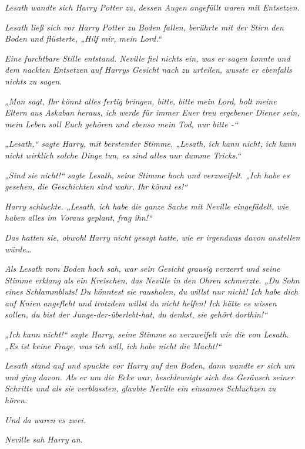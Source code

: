 {\emph{Lesath wandte sich Harry Potter zu, dessen Augen angefüllt waren mit Entsetzen.}

\emph{Lesath ließ sich vor Harry Potter zu Boden fallen, berührte mit der Stirn den Boden und flüsterte, „Hilf mir, mein Lord.“}

\emph{Eine furchtbare Stille entstand. Neville fiel nichts ein, was er sagen konnte und dem nackten Entsetzen auf Harrys Gesicht nach zu urteilen, wusste er ebenfalls nichts zu sagen.}

\emph{„Man sagt, Ihr könnt alles fertig bringen, bitte, bitte mein Lord, holt meine Eltern aus Askaban heraus, ich werde für immer Euer treu ergebener Diener sein, mein Leben soll Euch gehören und ebenso mein Tod, nur bitte -“}

\emph{„Lesath,“ sagte Harry, mit berstender Stimme, „Lesath, ich kann nicht, ich kann nicht wirklich solche Dinge tun, es sind alles nur dumme Tricks.“}

\emph{„Sind sie} \emph{\emph{nicht!}“ sagte Lesath, seine Stimme hoch und verzweifelt. „Ich habe es} \emph{\emph{gesehen,}} \emph{die Geschichten sind wahr, Ihr} \emph{\emph{könnt es!}“}

\emph{Harry schluckte. „Lesath, ich habe die ganze Sache mit Neville eingefädelt, wie haben alles im Voraus geplant, frag ihn!“}

\emph{Das hatten sie, obwohl Harry nicht gesagt hatte,} \emph{\emph{wie}} \emph{er irgendwas davon anstellen würde…}

\emph{Als Lesath vom Boden hoch sah, war sein Gesicht grausig verzerrt und seine Stimme erklang als ein Kreischen, das Neville in den Ohren schmerzte. „\emph{Du Sohn eines Schlammbluts! Du könntest sie rausholen, du willst nur nicht! Ich habe dich}} \emph{\emph{auf Knien}} \emph{\emph{angefleht und trotzdem willst du nicht helfen! Ich hätte es wissen sollen, du bist der Junge-der-überlebt-hat, du denkst, sie gehört dorthin!}“}

\emph{„Ich} \emph{\emph{kann nicht!}“ sagte Harry, seine Stimme so verzweifelt wie die von Lesath. „Es ist keine Frage, was ich will, ich habe nicht die} \emph{\emph{Macht!}“}

\emph{Lesath stand auf und spuckte vor Harry auf den Boden, dann wandte er sich um und ging davon. Als er um die Ecke war, beschleunigte sich das Geräusch seiner Schritte und als sie verblassten, glaubte Neville ein einsames Schluchzen zu hören.}

\emph{Und da waren es zwei.}

\emph{Neville sah Harry an.}

}
